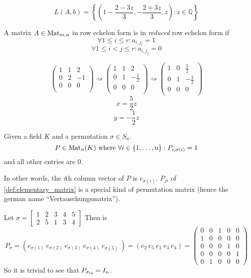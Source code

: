\begin{example}
   \[L(A, b) = \left\{\left(1 - \frac{2 - 3z}{3}, -\frac{2 + 3z}{3}, z\right): z \in \mathbb{Q}\right\}\]
\end{example}

\begin{definition}
   A matrix \(A \in \operatorname{Mat}_{m,n}\) in row echelon form is in \textit{reduced} row echelon form if
   \[\forall 1 \leq i \leq r: a_{i, j_i} = 1\]
   \[\forall 1 \leq i < j \leq r: a_{i, j_j} = 0\]
\end{definition}
\begin{example}
   \[\begin{pmatrix}
         1 & 1 &  2 \\
         0 & 2 & -1 \\
         0 & 0 & 0 \\
      \end{pmatrix} \rightsquigarrow \begin{pmatrix}
         1 & 1 &  2 \\
         0 & 1 & -\frac{1}{2} \\
         0 & 0 & 0 \\
      \end{pmatrix} \rightsquigarrow \begin{pmatrix}
         1 & 0 &  \frac{5}{2} \\
         0 & 1 & -\frac{1}{2} \\
         0 & 0 & 0 \\
      \end{pmatrix}
   \]
   \[x = \frac{5}{2}z\]
   \[y = -\frac{1}{2}z\]
\end{example}

\begin{definition}\label{def:perm_mat}
   Given a field \(K\) and a permutation \(\sigma \in S_n\).
   \[P \in \operatorname{Mat}_n(K)~\text{where}~\forall i \in \{1, \ldots, n\}: P_{i, \sigma(i)} = 1\]
   and all other entries are 0.
\end{definition}
\begin{remark}
   In other words, the \textit{i}th column vector of \(P\) is \(e_{\sigma(i)}\).
   \(P_{ji}\) of \cref{def:elementary_matrix} is a special kind of permutation matrix (hence the german name ``Vertauschungsmatrix'').
\end{remark}
\begin{example}
   Let \(\sigma = \begin{bmatrix}1&2&3&4&5\\2&5&1&3&4\end{bmatrix}\)
   Then is
   \[P_\sigma = (e_{\sigma(1)}~e_{\sigma(2)}~e_{\sigma(3)}~e_{\sigma(4)}~e_{\sigma(5)}~) = (e_2~e_5~e_1~e_3~e_4) = \begin{pmatrix}0&0&1&0&0\\1&0&0&0&0\\0&0&0&1&0\\0&0&0&0&1\\0&1&0&0&0\end{pmatrix}\]
   So it is trivial to see that \(P_{\sigma_{\operatorname{id}}} = I_n\).
\end{example}

